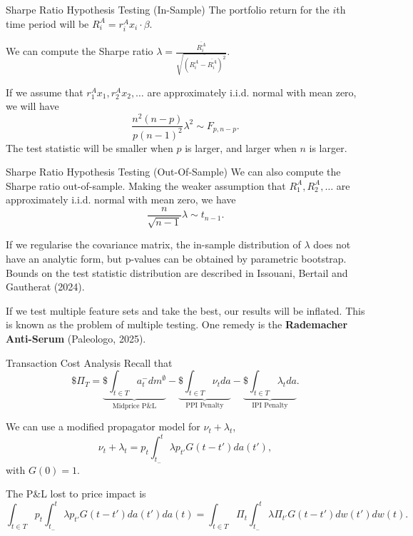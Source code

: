 \documentclass{beamer}
\begin{document}
\begin{frame}{Sharpe Ratio Hypothesis Testing (In-Sample)}
	The portfolio return for the $i$th time period will be $R_i^A = r_i^A x_i \cdot \beta$.

	We can compute the Sharpe ratio $\lambda = \frac{\overline{R_i^A}}{\sqrt{\overline{(R_i^A - \overline{R_i^A})^2}}}$.

	If we assume that $r_1^A x_1,r_2^A x_2,\ldots$ are approximately i.i.d. normal with mean zero, we will have
	$$\frac{n^2(n-p)}{p(n-1)^2}\lambda^2 \sim F_{p,n-p}.$$
	The test statistic will be smaller when $p$ is larger, and larger when $n$ is larger.%
\end{frame}

\begin{frame}{Sharpe Ratio Hypothesis Testing (Out-Of-Sample)}
	We can also compute the Sharpe ratio out-of-sample. Making the weaker assumption that $R_1^A,R_2^A,\ldots$ are approximately i.i.d. normal with mean zero, we have
	$$\frac{n}{\sqrt{n-1}}\lambda \sim t_{n-1}.$$

	If we regularise the covariance matrix, the in-sample distribution of $\lambda$ does not have an analytic form, but p-values can be obtained by parametric bootstrap. Bounds on the test statistic distribution are described in Issouani, Bertail and Gautherat (2024).

	If we test multiple feature sets and take the best, our results will be inflated. This is known as the problem of multiple testing. One remedy is the \textbf{Rademacher Anti-Serum} (Paleologo, 2025).
\end{frame}

\begin{frame}{Transaction Cost Analysis}
	Recall that
	$$\$\Pi_T	= \underbrace{\$\int_{t\in T} a_t^- dm^\emptyset}_{\textrm{Midprice P\&L}} - \underbrace{\$\int_{t\in T} \nu_t da}_{\textrm{PPI Penalty}} - \underbrace{\$\int_{t\in T} \lambda_t da}_{\textrm{IPI Penalty}}.$$
	
	We can use a modified propagator model for $\nu_t+\lambda_t$,
	$$\nu_t+\lambda_t = p_t\int_{t_-}^t \lambda p_{t'} G(t-t')da(t'),$$
	with $G(0)=1$.

	The P\&L lost to price impact is
	$$\int_{t\in T} p_t \int_{t_-}^t \lambda p_{t'} G(t-t')da(t') da(t) = \int_{t\in T} \Pi_t \int_{t_-}^t \lambda \Pi_{t'} G(t-t') dw(t') dw(t).$$
\end{frame}
\end{document}
